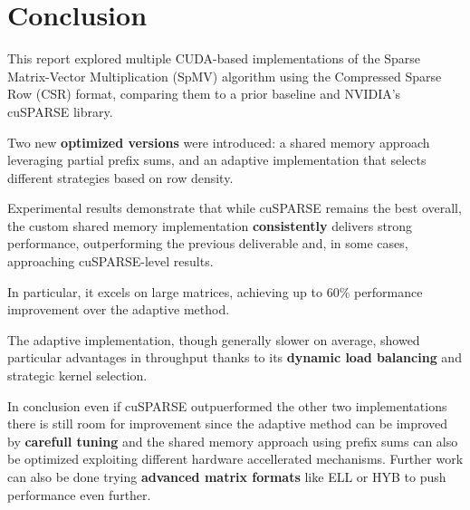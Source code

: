 \documentclass[conference]{IEEEtran}
\begin{document}
    \section{Conclusion}

    This report explored multiple CUDA-based implementations of the Sparse
    Matrix-Vector Multiplication (SpMV) algorithm using the Compressed Sparse
    Row (CSR) format, comparing them to a prior baseline and NVIDIA's cuSPARSE
    library.

    Two new \textbf{optimized versions} were introduced: a shared memory
    approach leveraging partial prefix sums, and an adaptive implementation
    that selects different strategies based on row density.

    Experimental results demonstrate that while cuSPARSE remains the best
    overall, the custom shared memory implementation \textbf{consistently}
    delivers strong performance, outperforming the previous deliverable and,
    in some cases, approaching cuSPARSE-level results.

    In particular, it excels on large matrices, achieving up to 60\%
    performance improvement over the adaptive method.

    The adaptive implementation, though generally slower on average, showed
    particular advantages in throughput thanks to its \textbf{dynamic load
    balancing} and strategic kernel selection.

    In conclusion even if cuSPARSE outpuerformed the other two implementations
    there is still room for improvement since the adaptive method can be
    improved by \textbf{carefull tuning} and the shared memory approach using
    prefix sums can also be optimized exploiting different hardware
    accellerated mechanisms.
    Further work can also be done trying \textbf{advanced matrix formats} like
    ELL or HYB to push performance even further.

    
    
\end{document}
